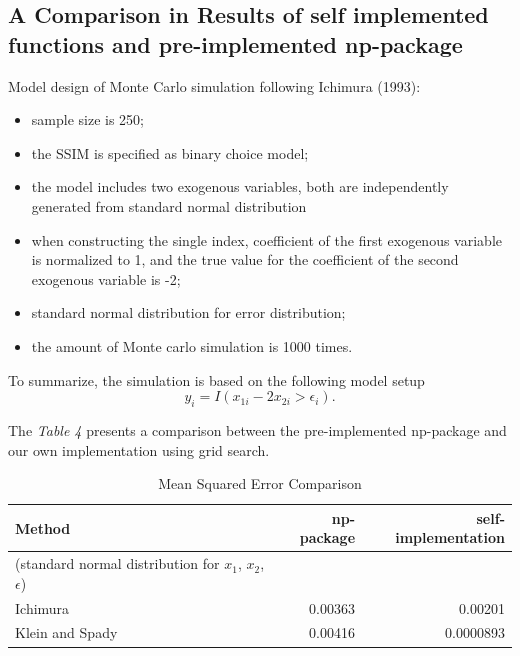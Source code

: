 \documentclass[a4paper]{article}
\begin{document}
\subsection{A Comparison in Results of self implemented functions and pre-implemented np-package}
Model design of Monte Carlo simulation following Ichimura (1993):
\begin{itemize}
\item sample size is 250;
\item the SSIM is specified as binary choice model;
\item the model includes two exogenous variables, both are independently generated from standard normal distribution  
\item when constructing the single index, coefficient of the first exogenous variable is normalized to 1, and the true value for the coefficient of the second exogenous variable is -2;
\item standard normal distribution for error distribution;
\item the amount of Monte carlo simulation is 1000 times.
\end{itemize}
To summarize, the simulation is based on the following model setup 
\begin{equation*}
y_i = I(x_{1i} - 2x_{2i} > \epsilon_i).
\end{equation*}

The \textit{Table 4} presents a comparison between the pre-implemented np-package and our own implementation using grid search.

\begin{table}[H]

\begin{tabular}{l r r}

\toprule
\textbf{Method} & \textbf{np-package} & \textbf{self-implementation} \tabularnewline\midrule
(standard normal distribution for $x_1$, $x_2$, $\epsilon$) & &
\tabularnewline
Ichimura & 0.00363 & 0.00201 \tabularnewline
Klein and Spady & 0.00416 & 0.0000893 \tabularnewline

\bottomrule
\end{tabular}
\caption {Mean Squared Error Comparison} \label{tab:mean squared error)
}

\end{table}
\end{document}
